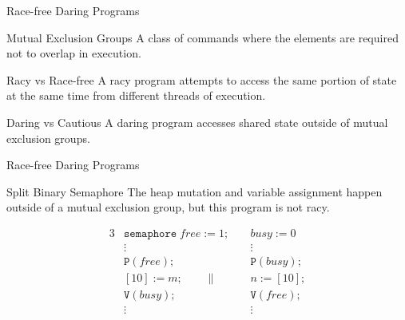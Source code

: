 \documentclass{beamer}
\begin{document}
\begin{frame}{Race-free Daring Programs}
  \begin{block}{Mutual Exclusion Groups}
    A class of commands where the elements are required not to overlap in execution.
  \end{block}

  \begin{block}{Racy vs Race-free}
    A racy program attempts to access the same portion of state at the same time from different threads of execution.
  \end{block}

  \begin{block}{Daring vs Cautious}
    A daring program accesses shared state outside of mutual exclusion groups.
  \end{block}
\end{frame}

\begin{frame}{Race-free Daring Programs}
  \begin{block}{Split Binary Semaphore}
    The heap mutation and variable assignment happen outside of a mutual exclusion group, but this program is not racy.
  \end{block}

  \begin{example}
    \begin{alignat*}{3}
      & \mathtt{semaphore}\; free := 1;\; &&busy := 0 \\
      & \vdots            && \vdots \\
      & \mathtt{P}(free); && \mathtt{P}(busy); \\
      & [10] := m; \qquad \|     && n := [10]; \\
      & \mathtt{V}(busy); && \mathtt{V}(free); \\
      & \vdots            && \vdots
    \end{alignat*}
  \end{example}
\end{frame}
\end{document}
